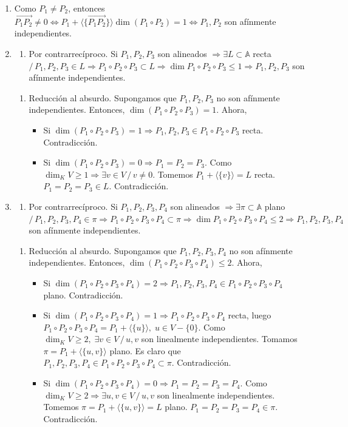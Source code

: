 \documentclass[12pt, a4paper, ones, notitlepage, openany,titlepage]{article}
\newcommand{\dobleimplicacion}[2]{
	\begin{enumerate}[label=$\Rightarrow/$]
		\item #1
	\end{enumerate}
	\begin{enumerate}[label=$\Leftarrow/$]
		\item #2
	\end{enumerate}
}
\begin{document}
\begin{enumerate}[label=(\arabic*)]
	\item Como $P_1 \neq P_2$, entonces $\overrightarrow{P_1 P_2} \neq 0 \Longleftrightarrow P_1 + \langle\{\overrightarrow{P_1 P_2}\}\rangle \dim(P_1 \circ P_2) = 1 \Longleftrightarrow P_1, P_2$ son afínmente independientes.
	\item \dobleimplicacion{Por contrarrecíproco.
	Si $P_1, P_2, P_3$ son alineados $\Longrightarrow \exists L \subset \mathbb{A}$ recta $/\, P_1, P_2, P_3 \in L \Longrightarrow P_1 \circ P_2 \circ P_3 \subset L \Longrightarrow \dim P_1 \circ P_2 \circ P_3 \le 1 \Longrightarrow P_1, P_2, P_3$ son afínmente independientes.
	}{Reducción al absurdo.
	Supongamos que $P_1, P_2, P_3$ no son afínmente independientes. Entonces, $\dim (P_1 \circ P_2 \circ P_3) = 1$. Ahora,
	\begin{itemize}
		\item Si $\dim(P_1 \circ P_2 \circ P_3) = 1 \Longrightarrow P_1, P_2, P_3 \in P_1 \circ P_2 \circ P_3$ recta. Contradicción.
		\item Si $\dim (P_1 \circ P_2 \circ P_3) = 0 \Longrightarrow P_1 = P_2 = P_3$. Como $\dim_K V \ge 1 \Longrightarrow \exists v \in V \,/\, v \neq 0$. Tomemos $P_1 + \langle\{v\}\rangle = L$ recta. $P_1 = P_2 = P_3 \in L$. Contradicción.
	\end{itemize}
	}
	\item \dobleimplicacion{Por contrarrecíproco.
	Si $P_1, P_2, P_3, P_4$ son alineados $\Longrightarrow \exists \pi \subset \mathbb{A}$ plano $/\, P_1, P_2, P_3, P_4 \in \pi \Longrightarrow P_1 \circ P_2 \circ P_3 \circ P_4 \subset \pi \Longrightarrow \dim P_1 \circ P_2 \circ P_3 \circ P_4 \le 2 \Longrightarrow P_1, P_2, P_3, P_4$ son afínmente independientes.
	}{Reducción al absurdo.
	Supongamos que $P_1, P_2, P_3, P_4$ no son afínmente independientes. Entonces, $\dim (P_1 \circ P_2 \circ P_3 \circ P_4) \le 2$. Ahora,
	\begin{itemize}
		\item Si $\dim(P_1 \circ P_2 \circ P_3 \circ P_4) = 2 \Longrightarrow P_1, P_2, P_3, P_4 \in P_1 \circ P_2 \circ P_3 \circ P_4$ plano. Contradicción.
		\item Si $\dim (P_1 \circ P_2 \circ P_3 \circ P_4) = 1 \Longrightarrow P_1 \circ P_2 \circ P_3 \circ P_4$ recta, luego $P_1 \circ P_2 \circ P_3 \circ P_4 = P_1 + \langle\{u\}\rangle, \; u \in V-\{0\}$. Como $\dim_K V \ge 2, \; \exists v \in V \,/\, u, v$ son linealmente independientes. Tomamos $\pi = P_1 + \langle\{u,v\}\rangle$ plano. Es claro que $P_1, P_2, P_3, P_4 \in P_1 \circ P_2 \circ P_3 \circ P_4 \subset \pi$. Contradicción.
		\item Si $\dim (P_1 \circ P_2 \circ P_3 \circ P_4) = 0 \Longrightarrow P_1 = P_2 = P_3 = P_4$. Como $\dim_K V \ge 2 \Longrightarrow \exists u,v \in V \,/\, u,v$ son linealmente independientes. Tomemos $\pi = P_1 + \langle\{u,v\}\rangle = L$ plano. $P_1 = P_2 = P_3 = P_4 \in \pi$. Contradicción.
	\end{itemize}
	}
\end{enumerate}
\end{document}
